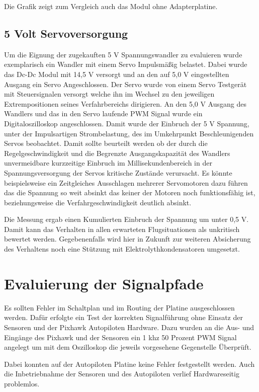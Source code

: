Die Grafik zeigt zum Vergleich auch das Modul ohne Adapterplatine.

\subsection{5 Volt Servoversorgung}

Um die Eignung der zugekauften 5 V Spannungswandler zu evaluieren wurde exemplarisch ein Wandler mit einem Servo Impulsmäßig belastet.
Dabei wurde das Dc-Dc Modul mit 14,5 V versorgt und an den auf 5,0 V eingestellten Ausgang ein Servo Angeschlossen. Der Servo wurde von einem Servo Testgerät mit Steuersignalen versorgt welche ihn im Wechsel zu den jeweiligen Extrempositionen seines Verfahrbereichs dirigieren. 
An den 5,0 V Ausgang des Wandlers und das in den Servo laufende PWM Signal wurde ein  Digitaloszilloskop angeschlossen. Damit  wurde der Einbruch der 5 V Spannung, unter der Impulsartigen Strombelastung, des im Umkehrpunkt Beschleunigenden Servos beobachtet.
Damit sollte beurteilt werden ob der durch die Regelgeschwindigkeit und die Begrenzte Ausgangskapazität des Wandlers unvermeidbare kurzzeitige Einbruch im Millisekundenbereich in der Spannungsversorgung der Servos kritische Zustände verursacht.
Es könnte beispielsweise ein Zeitgleiches Ausschlagen mehrerer Servomotoren dazu führen das die Spannung so weit absinkt das keiner der Motoren noch funktionsfähig ist, beziehungsweise die Verfahrgeschwindigkeit deutlich absinkt.

Die Messung ergab einen Kumulierten Einbruch der Spannung um unter 0,5 V. 
Damit kann das Verhalten in allen erwarteten Flugsituationen als unkritisch bewertet werden. Gegebenenfalls wird hier in Zukunft zur weiteren Absicherung des Verhaltens noch eine Stützung mit Elektrolythkondensatoren umgesetzt. 

\section{Evaluierung der Signalpfade}

Es sollten Fehler im Schaltplan und im Routing der Platine ausgeschlossen werden. Dafür erfolgte ein Test der korrekten Signalführung ohne Einsatz der Sensoren und der Pixhawk Autopiloten Hardware. Dazu wurden an die Aus- und Eingänge des Pixhawk und der Sensoren ein 1 khz 50 Prozent PWM Signal angelegt um mit dem Oszilloskop die jeweils vorgesehene Gegenstelle Überprüft.

Dabei konnten auf der Autopiloten Platine keine Fehler festgestellt werden.
Auch die Inbetriebnahme der Sensoren und des Autopiloten verlief Hardwareseitig problemlos.

